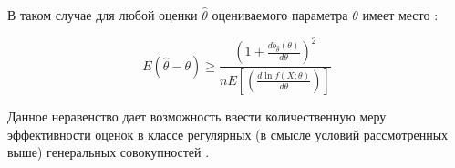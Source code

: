 В таком случае для любой оценки ${\hat \theta}$ оцениваемого параметра ${\theta}$ имеет место \cite{aivazyan-book}:
\begin{center}
\begin{equation}
	\label{eq:crlb_expect_val}
	E(\hat \theta - \theta) \ge \frac{\left(1+\frac{db_{\hat \theta}(\theta)}{d \theta}\right)^2}
		{nE\left[ \left( \frac{d \ln f(X; \theta)}{d \theta}\right)\right]}
\end{equation}
\end{center}

Данное неравенство дает возможность ввести количественную меру эффективности оценок в классе регулярных (в смысле условий рассмотренных выше)
генеральных совокупностей \cite{aivazyan-book}.
